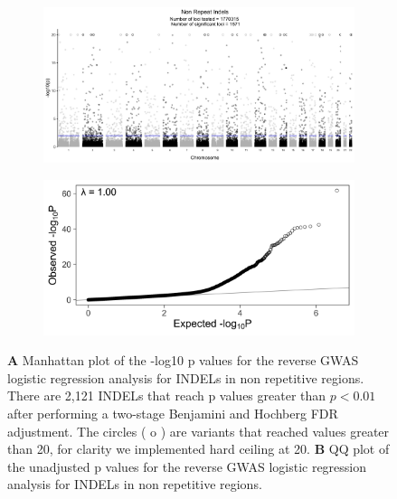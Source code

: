\documentclass[9pt,lineno]{elife}
\begin{document}
\begin{figure} \centering
    \begin{subfigure}[b]{\linewidth}
        \includegraphics[width=\hsize]{./Figures/ManhattanPlot_NonRepeatIndels.jpg}
        \label{fig:a}
    \end{subfigure} %

    \begin{subfigure}[b]{\linewidth}
    	\center    
        \includegraphics[width=\hsize]{./Figures/QQPlot_NonRepeatIndels.jpg}
        \label{fig:b}    
    \end{subfigure} 
    \caption{\textbf{A} Manhattan plot of the -log10 p values for the reverse GWAS logistic regression analysis for INDELs in non repetitive regions. There are 2,121 INDELs that reach p values greater than $ p < 0.01$ after performing a two-stage Benjamini and Hochberg FDR adjustment.  The circles ( o ) are variants that reached values greater than 20, for clarity we implemented hard ceiling at 20. 
  \textbf{B} QQ plot of the unadjusted p values for the reverse GWAS logistic regression analysis for INDELs in non repetitive regions.}
  \label{NRI_Manhattan}
  \end{figure}
\end{document}
